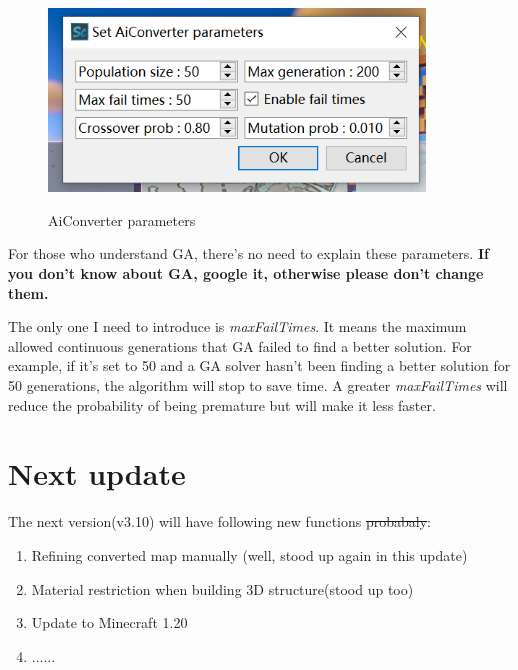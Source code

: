 \documentclass{article}
\begin{document}
\begin{figure}[htbp]
    \centering
    \includegraphics[width=10cm]{Img13_AiCvterPara.png}
    \label{GAOpt}
    \caption{AiConverter parameters}
\end{figure}

For those who understand GA, there's no need to explain these parameters. \textbf{If you don't know about GA, google it, otherwise please don't change them.}

The only one I need to introduce is \textit{maxFailTimes}. It means the maximum allowed continuous generations that GA failed to find a better solution. For example, if it's set to 50 and a GA solver hasn't been finding a better solution for 50 generations, the algorithm will stop to save time. A greater \textit{maxFailTimes} will reduce the probability of being premature but will make it less faster.


\pagebreak
\section{Next update}
The next version(v3.10) will have following new functions \st{probabaly}:
\begin{enumerate}
    \item Refining converted map manually (well, stood up again in this update)
    \item Material restriction when building 3D structure(stood up too)
    \item Update to Minecraft 1.20
    \item ......
\end{enumerate}
\end{document}
